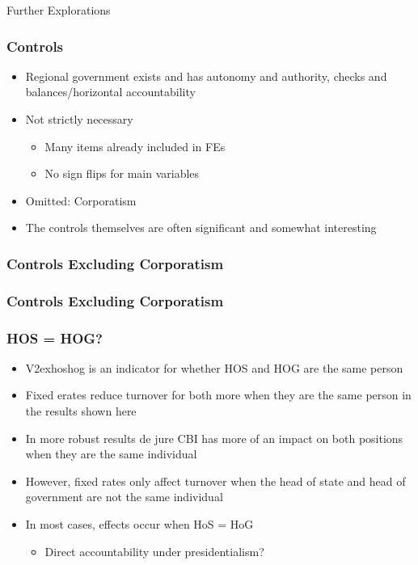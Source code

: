 \documentclass{beamer}
\begin{document}
    \begin{frame}
        \centering Further Explorations
    \end{frame}

    \begin{frame}
        \frametitle{Controls}
        \begin{itemize}
            \item Regional government exists and has autonomy and authority, checks and balances/horizontal accountability
            \item Not strictly necessary
                \begin{itemize}
                    \item Many items already included in FEs
                    \item No sign flips for main variables
                \end{itemize}
            \item Omitted: Corporatism
            \item The controls themselves are often significant and somewhat interesting
        \end{itemize}
    \end{frame}

    \begin{frame}
        \frametitle{Controls Excluding Corporatism}
        {
            \let\oldcentering\centering
            \renewcommand\centering{\tiny\oldcentering}
            
        }
    \end{frame}

    \begin{frame}
        \frametitle{Controls Excluding Corporatism}
        {
            \let\oldcentering\centering
            \renewcommand\centering{\tiny\oldcentering}
            
        }
    \end{frame}

    \begin{frame}
        \frametitle{HOS = HOG?}
        \begin{itemize}
            \item V2exhoshog is an indicator for whether HOS and HOG are the same person
            \item Fixed erates reduce turnover for both more when they are the same person in the results shown here
            \item In more robust results de jure CBI has more of an impact on both positions when they are the same individual
            \item However, fixed rates only affect turnover when the head of state and head of government are not the same individual
            \item In most cases, effects occur when HoS = HoG
            \begin{itemize}
                \item Direct accountability under presidentialism?
            \end{itemize}
        \end{itemize}
    \end{frame}
\end{document}

